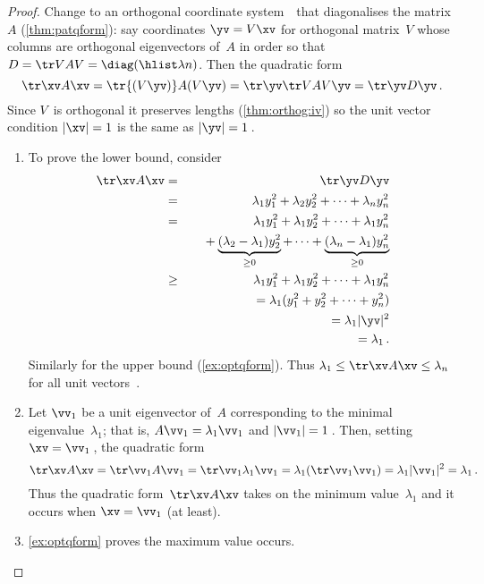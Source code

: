 \begin{proof} 
Change to an orthogonal coordinate system~\yv\ that diagonalises the matrix~\(A\) (\autoref{thm:patqform}): say coordinates \(\yv=V\xv\) for orthogonal matrix~\(V\) whose columns are orthogonal eigenvectors of~\(A\) in order so that \(D=\tr VAV=\diag(\hlist\lambda n)\).
Then the quadratic form 
\begin{equation*}
\tr\xv A\xv=\tr{(V\yv)} A(V\yv)=\tr\yv \tr VAV\yv=\tr\yv D\yv\,.
\end{equation*}
Since \(V\)~is orthogonal it preserves lengths (\autoref{thm:orthog:iv}) so the unit vector condition \(|\xv|=1\) is the same as \(|\yv|=1\)\,.
\begin{enumerate}
\item To prove the lower bound, consider
\begin{eqnarray*}
\tr\xv A\xv&=&\tr\yv D\yv
\\&=&\lambda_1y_1^2+\lambda_2y_2^2+\cdots+\lambda_ny_n^2
\\&=&\lambda_1y_1^2+\lambda_1y_2^2+\cdots+\lambda_1y_n^2
\\&&\quad{}
+\underbrace{(\lambda_2-\lambda_1)y_2^2}_{\geq0}
+\cdots+\underbrace{(\lambda_n-\lambda_1)y_n^2}_{\geq0}
\\&\geq&\lambda_1y_1^2+\lambda_1y_2^2+\cdots+\lambda_1y_n^2
\\&&{}=\lambda_1(y_1^2+y_2^2+\cdots+y_n^2)
\\&&{}=\lambda_1|\yv|^2
\\&&{}=\lambda_1\,.
\end{eqnarray*}
Similarly for the upper bound (\autoref{ex:optqform}).  
Thus \(\lambda_1\leq \tr\xv A\xv\leq\lambda_n\) for all unit vectors~\xv.

\item Let \(\vv_1\) be a unit eigenvector of~\(A\) corresponding to the minimal eigenvalue~\(\lambda_1\); that is, \(A\vv_1=\lambda_1\vv_1\) and \(|\vv_1|=1\)\,.
Then, setting \(\xv=\vv_1\)\,, the quadratic form
\begin{equation*}
\tr\xv A\xv=\tr\vv_1A\vv_1
=\tr\vv_1\lambda_1\vv_1
=\lambda_1(\tr\vv_1\vv_1)
=\lambda_1|\vv_1|^2
=\lambda_1\,.
\end{equation*}
Thus the quadratic form~\(\tr\xv A\xv\) takes on the minimum value~\(\lambda_1\) and it occurs when \(\xv=\vv_1\) (at least).

\item \autoref{ex:optqform} proves the maximum value occurs.
\end{enumerate}
\end{proof}


